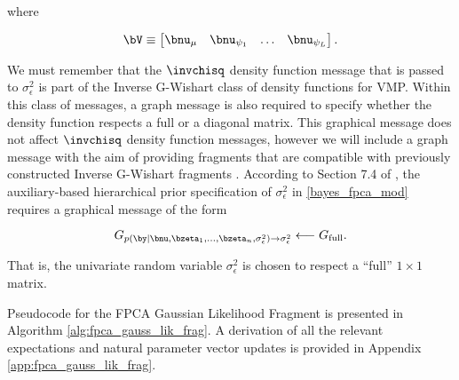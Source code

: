 \documentclass[12pt]{article}
\def\sigsqeps{\sigma^2_{\epsilon}}
\def\numu{\bnu_\mu}
\newcommand\nupsi[1]{\bnu_{\psi_{#1}}}
\theoremstyle{plain}
\theoremstyle{definition}
\theoremstyle{remark}
\begin{document}
\noindent where

\begin{equation}
	\bV \equiv \begin{bmatrix}
		\numu & \nupsi{1} & \dots & \nupsi{L}
	\end{bmatrix}.
\label{V_mat}
\end{equation}

\noindent We must remember that the $\invchisq$ density function message that is passed
to $\sigsqeps$ is part of the Inverse G-Wishart class of density functions for VMP. Within this class of messages,
a graph message is also required to specify whether the density function respects a full or a diagonal matrix. This
graphical message does not affect $\invchisq$ density function messages, however we will include
a graph message with the aim of providing fragments that are compatible with previously constructed Inverse
G-Wishart fragments \cite[Algorithms 1 \& 2]{maestrini20}. According to Section 7.4 of ,
the auxiliary-based hierarchical prior specification of $\sigsqeps$ in \eqref{bayes_fpca_mod} requires a
graphical message of the form

\begin{equation}
	G_{p (\by | \bnu, \bzeta_1, \dots, \bzeta_n, \sigsqeps) \rightarrow \sigsqeps}
		\longleftarrow
			G_{\text{full}}.
\label{G_lik_sigsqeps}
\end{equation}

\noindent That is, the univariate random variable $\sigsqeps$ is chosen to respect a ``full'' $1 \times 1$ matrix.

Pseudocode for the FPCA Gaussian Likelihood Fragment is presented in Algorithm \ref{alg:fpca_gauss_lik_frag}.
A derivation of all the relevant expectations and natural parameter vector updates is provided in Appendix
\ref{app:fpca_gauss_lik_frag}.
\end{document}

